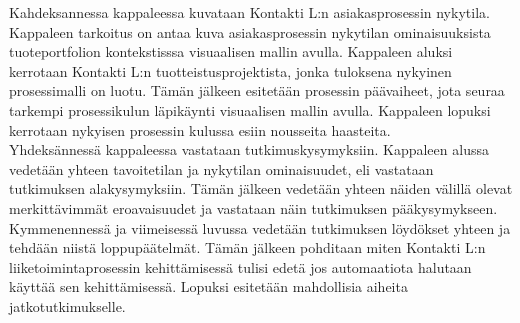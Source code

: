 \documentclass[finnish,12pt,a4paper,pdftex]{article}
\begin{document}
\noindent Kahdeksannessa kappaleessa kuvataan Kontakti L:n asiakasprosessin nykytila. Kappaleen tarkoitus on antaa kuva asiakasprosessin nykytilan ominaisuuksista tuoteportfolion kontekstisssa visuaalisen mallin avulla. Kappaleen aluksi kerrotaan Kontakti L:n tuotteistusprojektista, jonka tuloksena nykyinen prosessimalli on luotu. Tämän jälkeen esitetään prosessin päävaiheet, jota seuraa tarkempi prosessikulun läpikäynti visuaalisen mallin avulla. Kappaleen lopuksi kerrotaan nykyisen prosessin kulussa esiin nousseita haasteita.\\

\noindent Yhdeksännessä kappaleessa vastataan tutkimuskysymyksiin. Kappaleen alussa vedetään yhteen tavoitetilan ja nykytilan ominaisuudet, eli vastataan tutkimuksen alakysymyksiin. Tämän jälkeen vedetään yhteen näiden välillä olevat merkittävimmät eroavaisuudet ja vastataan näin tutkimuksen pääkysymykseen.\\

\noindent Kymmenennessä ja viimeisessä luvussa vedetään tutkimuksen löydökset yhteen ja tehdään niistä loppupäätelmät. Tämän jälkeen pohditaan miten Kontakti L:n liiketoimintaprosessin kehittämisessä tulisi edetä jos automaatiota halutaan käyttää sen kehittämisessä. Lopuksi esitetään mahdollisia aiheita jatkotutkimukselle.






\end{document}
